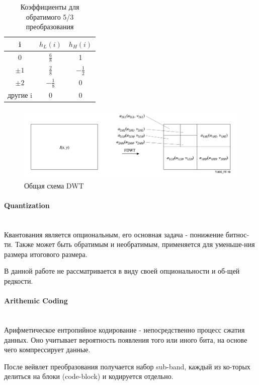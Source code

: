 \documentclass[a4paper]{article}
\begin{document}
  \begin{table}[H]
    \centering
    \begin{tabular}{| c | c | c |}
      \hline
      i & $h_L(i)$ & $h_H(i)$ \\
      \hline
      0 & $\frac{6}{8}$ & 1 \\
      \hline
      $\pm 1$ & $\frac{2}{8}$ & $-\frac{1}{2}$ \\
      \hline
      $\pm 2$& $-\frac{1}{8}$ & 0  \\
      \hline
      другие i & 0 & 0 \\
      \hline
    \end{tabular}
    \caption{Коэффициенты для обратимого 5/3 преобразования}
  \end{table}

  \begin{figure}[H]
    \centering
    \includegraphics[width=\textwidth]{dwt}
    \caption{Общая схема DWT}
  \end{figure}

  \paragraph{Quantization}\mbox{}\\
  Квантования является опциональным, его основная задача - понижение битнос-ти.
  Также может быть обратимым и необратимым, применяется для уменьше-ния размера
  итогового размера.

  В данной работе не рассматривается в виду своей опциональности и об-щей редкости.

  \paragraph{Arithemic Coding}\mbox{}\\
  Арифметическое ентропийное кодирование - непосредственно процесс сжатия данных.
  Оно учитывает вероятность появления того или иного бита, на основе чего компрессирует данные.

  После вейвлет преобразования получается набор sub-band, каждый из ко-торых
  делиться на блоки (code-block) и кодируется отдельно.
\end{document}
